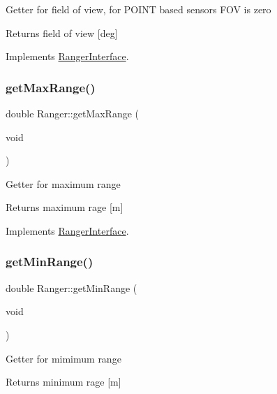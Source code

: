 Getter for field of view, for P\+O\+I\+NT based sensors F\+OV is zero \begin{DoxyReturn}{Returns}
field of view \mbox{[}deg\mbox{]} 
\end{DoxyReturn}


Implements \hyperlink{classRangerInterface_a18716da6932402b8dda75f682be6f06c}{Ranger\+Interface}.

\mbox{\label{classRanger_aba5e81260e55089d9ff869051156a722}} 
\subsubsection{\texorpdfstring{get\+Max\+Range()}{getMaxRange()}}
{\footnotesize\ttfamily double Ranger\+::get\+Max\+Range (\begin{DoxyParamCaption}\item[{void}]{ }\end{DoxyParamCaption})\hspace{0.3cm}{\ttfamily [virtual]}}

Getter for maximum range \begin{DoxyReturn}{Returns}
maximum rage \mbox{[}m\mbox{]} 
\end{DoxyReturn}


Implements \hyperlink{classRangerInterface_a0bb29a41de5767c99081002c0590c186}{Ranger\+Interface}.

\mbox{\label{classRanger_a646a06d3916179b9ebc4502bad169eec}} 
\subsubsection{\texorpdfstring{get\+Min\+Range()}{getMinRange()}}
{\footnotesize\ttfamily double Ranger\+::get\+Min\+Range (\begin{DoxyParamCaption}\item[{void}]{ }\end{DoxyParamCaption})\hspace{0.3cm}{\ttfamily [virtual]}}

Getter for mimimum range \begin{DoxyReturn}{Returns}
minimum rage \mbox{[}m\mbox{]} 
\end{DoxyReturn}


